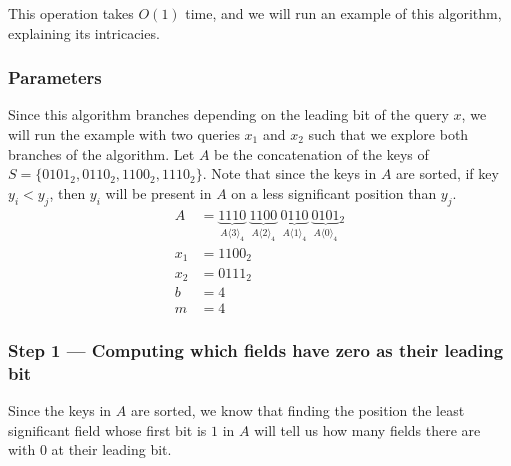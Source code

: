 This operation takes $O(1)$ time, and we will run an example of this algorithm, explaining its intricacies.

\subsubsection{Parameters}

Since this algorithm branches depending on the leading bit of the query $x$, we will run the example with two queries $x_1$ and $x_2$ such that we explore both branches of the algorithm. Let $A$ be the concatenation of the keys of $S = \{0101_2, 0110_2, 1100_2, 1110_2 \}$. Note that since the keys in $A$ are sorted, if key $y_i < y_j$, then $y_i$ will be present in $A$ on a less significant position than $y_j$.
\begin{align*}
    A &= \underbrace{1110}_{A\langle 3 \rangle_4}\ \underbrace{1100}_{A\langle 2 \rangle_4}\ \underbrace{0110}_{A\langle 1\rangle_4}\ \underbrace{0101}_{A\langle 0 \rangle_4}{}_2 \\
    x_1 &= 1100_2 \\
    x_2 &= 0111_2 \\
    b &= 4 \\
    m &= 4
\end{align*}

\subsubsection{Step 1 --- Computing which fields have zero as their leading bit} \label{sec:computeM}

Since the keys in $A$ are sorted, we know that finding the position the least significant field whose first bit is $1$ in $A$ will tell us how many fields there are with $0$ at their leading bit.


